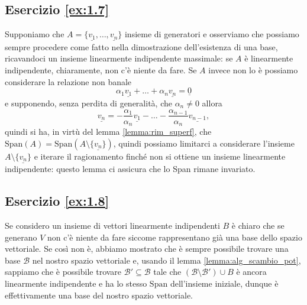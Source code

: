 \subsection*{Esercizio \ref{ex:1.7}}
Supponiamo che $A = \{ \underline{v_1}, \ldots, \underline{v_n} \}$ insieme di generatori e osserviamo che possiamo sempre procedere come fatto nella dimostrazione dell'esistenza di una base, ricavandoci un insieme linearmente indipendente massimale: se $A$ è linearmente indipendente, chiaramente, non c'è niente da fare. Se $A$ invece non lo è possiamo considerare la relazione non banale
$$
    \alpha_1 \underline{v_1} + \ldots + \alpha_n \underline{v_n} = \underline{0}
$$
e supponendo, senza perdita di generalità, che $\alpha_n \neq 0$ allora
$$
    \underline{v_n} = - \frac{\alpha_1}{\alpha_n} \underline{v_1} - \ldots - \frac{\alpha_{n-1}}{\alpha_n} \underline{v_{n-1}},
$$
quindi si ha, in virtù del lemma \ref{lemma:rim_superf}, che $\text{Span}(A) = \text{Span}(A \setminus \{ \underline{v_n} \})$, quindi possiamo limitarci a considerare l'insieme $A \setminus \{ \underline{v_n} \}$ e iterare il ragionamento finché non si ottiene un insieme linearmente indipendente: questo lemma ci assicura che lo Span rimane invariato.

\subsection*{Esercizio \ref{ex:1.8}}
Se considero un insieme di vettori linearmente indipendenti $B$ è chiaro che se generano $V$ non c'è niente da fare siccome rappresentano già una base dello spazio vettoriale. Se così non è, abbiamo mostrato che è sempre possibile trovare una base $\mathcal{B}$ nel nostro spazio vettoriale e, usando il lemma \ref{lemma:alg_scambio_pot}, sappiamo che è possibile trovare $\mathcal{B'} \subseteq \mathcal{B}$ tale che $(\mathcal{B} \setminus \mathcal{B'}) \cup B$ è ancora linearmente indipendente e ha lo stesso $\text{Span}$ dell'insieme iniziale, dunque è effettivamente una base del nostro spazio vettoriale.

